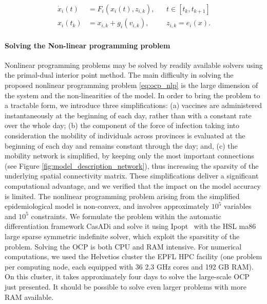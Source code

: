\begin{align*}
\dot x_i(t) &= F_i(x_i(t),z_{i,k}), && t\in[t_k,t_{k+1}] \\
x_i(t_k) &= x_{i,k} + g_i(v_{i,k}), && z_{i,k} = e_i(x).
\end{align*}

\paragraph{Solving the Non-linear programming problem} Nonlinear programming problems may be solved by readily available solvers using the primal-dual interior point method. The main difficulty in solving the proposed nonlinear programming problem \eqref{eq:ocp_nlp} is the large dimension of the system and the non-linearities of the model. In order to bring the problem to a tractable form, we introduce three simplifications: (a) vaccines are administered instantaneously at the beginning of each day, rather than with a constant rate over the whole day; (b) the component of the force of infection taking into consideration the mobility of individuals across provinces is evaluated at the beginning of each day and remains constant through the day; and, (c) the mobility network is simplified, by keeping only the most important connections (see Figure \ref{fig:model_description_network}), thus increasing the sparsity of the underlying spatial connectivity matrix. These simplifications deliver a significant computational advantage, and we verified that the impact on the model accuracy is limited. 
The nonlinear programming problem arising from the simplified epidemiological model is non-convex, and involves approximately $10^{5}$ variables and $10^5$ constraints. We formulate the problem within the automatic differentiation framework CasADi\cite{Andersson:CasADiSoftwareFramework:2018} and solve it using Ipopt~\cite{Wachter:ImplementationInteriorpointFilter:2006} with the HSL ma86 large sparse symmetric indefinite solver\cite{HSLCollectionFortran}, which exploit the sparsitity of the problem. 
Solving the OCP is both CPU and RAM intensive. For numerical computations, we used the Helvetios cluster the EPFL HPC facility (one problem per computing node, each equipped with 36 2.3 GHz cores and 192 GB RAM). On this cluster, it takes approximately four days to solve the large-scale OCP just presented. It should be possible to solve even larger problems with more RAM available. 


